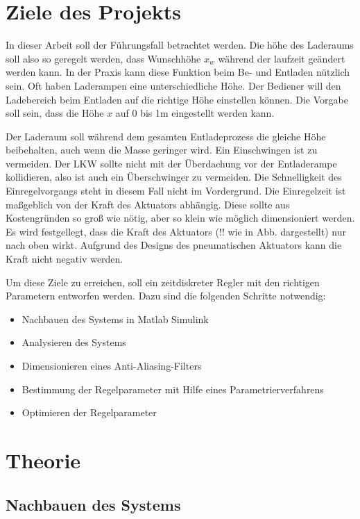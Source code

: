\section{Ziele des Projekts}
In dieser Arbeit soll der Führungsfall betrachtet werden. Die höhe des Laderaums soll also so geregelt werden, dass Wunschhöhe $x_{w}$ während der laufzeit geändert werden kann.
In der Praxis kann diese Funktion beim Be- und Entladen nützlich sein. Oft haben Laderampen eine unterschiedliche Höhe. Der Bediener will den Ladebereich
beim Entladen auf die richtige Höhe einstellen können. Die Vorgabe soll sein, dass die Höhe $x$ auf 0 bis 1m eingestellt werden kann.

Der Laderaum soll während dem gesamten Entladeprozess die gleiche Höhe beibehalten, auch wenn die Masse geringer wird.
Ein Einschwingen ist zu vermeiden. Der LKW sollte nicht mit der Überdachung vor der Entladerampe kollidieren, also ist auch ein Überschwinger zu vermeiden.
Die Schnelligkeit des Einregelvorgangs steht in diesem Fall nicht im Vordergrund. Die Einregelzeit ist maßgeblich von der Kraft des Aktuators abhängig.
Diese sollte aus Kostengründen so groß wie nötig, aber so klein wie möglich dimensioniert werden. 
Es wird festgellegt, dass die Kraft des Aktuators (!! wie in Abb. dargestellt) nur nach oben wirkt. Aufgrund des Designs des pneumatischen Aktuators kann 
die Kraft nicht negativ werden.

Um diese Ziele zu erreichen, soll ein zeitdiskreter Regler mit den
richtigen Parametern entworfen werden. Dazu sind die
folgenden Schritte notwendig:

\begin{itemize}
	\item Nachbauen des Systems in Matlab Simulink
	\item Analysieren des Systems
	\item Dimensionieren eines Anti-Aliasing-Filters
	\item Bestimmung der Regelparameter mit Hilfe eines Parametrierverfahrens
	\item Optimieren der Regelparameter
\end{itemize}
	
\section{Theorie}

\subsection{Nachbauen des Systems}

